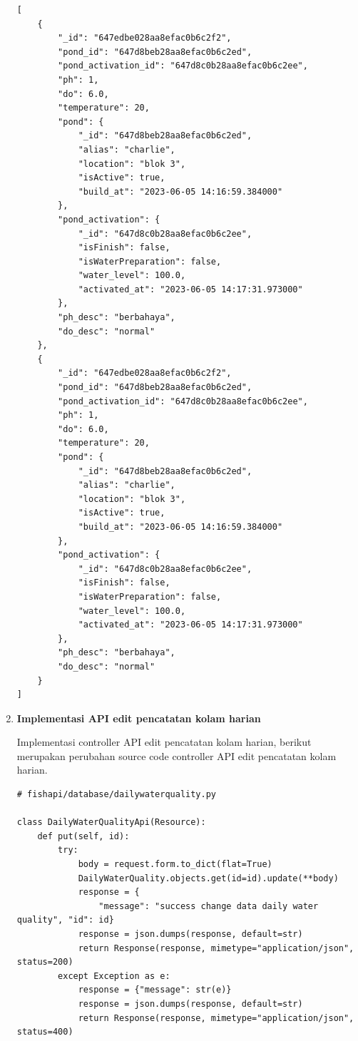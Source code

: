 \begin{enumerate}[1.]
\begin{lstlisting}
[
    {
        "_id": "647edbe028aa8efac0b6c2f2",
        "pond_id": "647d8beb28aa8efac0b6c2ed",
        "pond_activation_id": "647d8c0b28aa8efac0b6c2ee",
        "ph": 1,
        "do": 6.0,
        "temperature": 20,
        "pond": {
            "_id": "647d8beb28aa8efac0b6c2ed",
            "alias": "charlie",
            "location": "blok 3",
            "isActive": true,
            "build_at": "2023-06-05 14:16:59.384000"
        },
        "pond_activation": {
            "_id": "647d8c0b28aa8efac0b6c2ee",
            "isFinish": false,
            "isWaterPreparation": false,
            "water_level": 100.0,
            "activated_at": "2023-06-05 14:17:31.973000"
        },
        "ph_desc": "berbahaya",
        "do_desc": "normal"
    },
    {
        "_id": "647edbe028aa8efac0b6c2f2",
        "pond_id": "647d8beb28aa8efac0b6c2ed",
        "pond_activation_id": "647d8c0b28aa8efac0b6c2ee",
        "ph": 1,
        "do": 6.0,
        "temperature": 20,
        "pond": {
            "_id": "647d8beb28aa8efac0b6c2ed",
            "alias": "charlie",
            "location": "blok 3",
            "isActive": true,
            "build_at": "2023-06-05 14:16:59.384000"
        },
        "pond_activation": {
            "_id": "647d8c0b28aa8efac0b6c2ee",
            "isFinish": false,
            "isWaterPreparation": false,
            "water_level": 100.0,
            "activated_at": "2023-06-05 14:17:31.973000"
        },
        "ph_desc": "berbahaya",
        "do_desc": "normal"
    }
]
\end{lstlisting}



\item \textbf{Implementasi API edit pencatatan kolam harian}

Implementasi controller API edit pencatatan kolam harian, berikut merupakan perubahan source code controller API edit pencatatan kolam harian.

\begin{lstlisting}
# fishapi/database/dailywaterquality.py

class DailyWaterQualityApi(Resource):
    def put(self, id):
        try:
            body = request.form.to_dict(flat=True)
            DailyWaterQuality.objects.get(id=id).update(**body)
            response = {
                "message": "success change data daily water quality", "id": id}
            response = json.dumps(response, default=str)
            return Response(response, mimetype="application/json", status=200)
        except Exception as e:
            response = {"message": str(e)}
            response = json.dumps(response, default=str)
            return Response(response, mimetype="application/json", status=400)
\end{lstlisting}


\end{enumerate}
